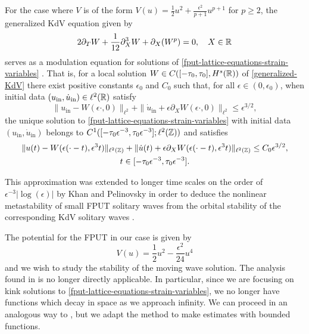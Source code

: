 For the case where \(V\) is of the form \(V(u) = \frac 1 2 u^2 + \frac{\epsilon^2}{p+1} u^{p+1}\) for \(p\geq 2\), the generalized KdV equation given by 
\begin{equation}\label{generalized-KdV}
	2 \partial_TW + \frac 1 {12} \partial_X^3 W + \partial_X(W^p) = 0,\quad X\in\mathbb{R}
\end{equation} 
serves as a modulation equation for solutions of \cref{fput-lattice-equations-strain-variables} \cite{bambusi2006metastability,friesecke1999solitary,schneider2000counter}. That is, for a local solution \(W\in C([-\tau_0,\tau_0],H^s(\mathbb{R}))\) of \cref{generalized-KdV} there exist positive constants \(\epsilon_0\) and \(C_0\) such that, for all \(\epsilon \in (0,\epsilon_0)\), when initial data \((u_{\mathrm{in} }, \dot u_{\mathrm{in}})\in\ell^2(\mathbb{R})\) satisfy
\begin{equation}
	\|u_{\mathrm{in}} - W(\epsilon\cdot, 0) \|_{\ell^2} + \| \dot u_{\mathrm{in}} + \epsilon \partial_X W(\epsilon\cdot, 0) \|_{\ell^2} \leq \epsilon^{3/2},
\end{equation}
the unique solution to \cref{fput-lattice-equations-strain-variables} with initial data \((u_{\mathrm{in} }, \dot u_{\mathrm{in}})\) belongs to \(C^1([-\tau_0\epsilon^{-3}, \tau_0 \epsilon^{-3}];\allowbreak \ell^2(\mathbb{Z}))\) and satisfies 
\begin{multline}
	\|u(t) - W(\epsilon (\cdot - t),\epsilon^3 t)\|_{\ell^2(\mathbb{Z})} + \| \dot u(t) + \epsilon \partial_X W(\epsilon(\cdot - t), \epsilon^3 t) \|_{\ell^2(\mathbb{Z})} \leq C_0 \epsilon^{3/2}, \\ t\in[-\tau_0 \epsilon^{-3},\tau_0 \epsilon^{-3}].
\end{multline}

This approximation was extended to longer time scales on the order of \(\epsilon^{-3}|\log(\epsilon)|\) by Khan and Pelinovsky in order to deduce the nonlinear metastability of small FPUT solitary waves from the orbital stability of the corresponding KdV solitary waves \cite{khan2017long}.

The potential for the FPUT in our case is given by
\begin{equation}\label{truncated-potential}
	V(u) = \frac 1 2 u^2 - \frac{\epsilon^2} {24} u^4
\end{equation}
and we wish to study the stability of the moving wave solution. The analysis found in \cite{khan2017long} is no longer directly applicable. In particular, since we are focusing on kink solutions to \cref{fput-lattice-equations-strain-variables}, we no longer have functions which decay in space as we approach infinity. We can proceed in an analogous way to \cite{khan2017long}, but we adapt the method to make estimates with bounded functions. 


